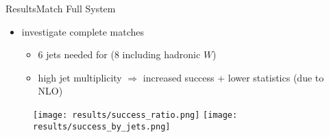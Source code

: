 \documentclass[9pt, aspectratio=169]{beamer}
\begin{document}
\begin{frame}{Results}{Match Full \ttbar System}
	\begin{itemize}
		\item investigate complete \ttbar matches
		\begin{itemize}
			\item 6 jets needed for \ttbar (8 including hadronic $W$)
			\item high jet multiplicity $\Rightarrow$ increased success + lower statistics (due to NLO)
	  	\end{itemize}
	\end{itemize}
	\begin{figure}
		\centering
		\texttt{[image: results/success\_ratio.png]}\hspace{.02\textwidth}
		\texttt{[image: results/success\_by\_jets.png]}
	\end{figure}
\end{frame}
\end{document}
